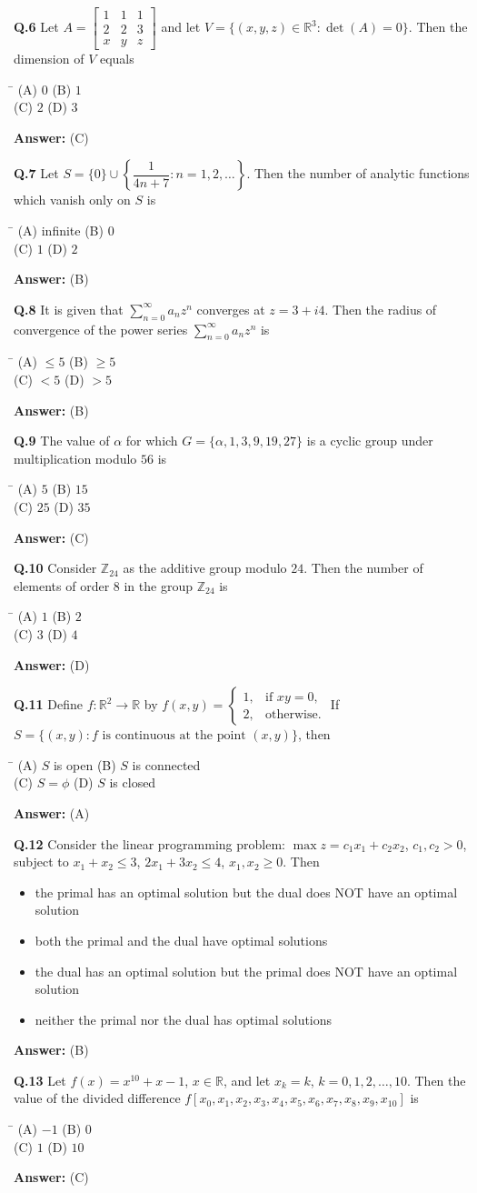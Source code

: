 \documentclass[11pt,a4paper]{article}
\newcommand{\optsfourA}[4]{%
  \begin{tabbing}
    \hspace{0.48\linewidth}\=\kill
    (A) #1 \> (B) #2 \\[2pt]
    (C) #3 \> (D) #4
  \end{tabbing}%
}
\newcommand{\optslistA}[4]{%
  \begin{itemize}
    \setlength{\itemsep}{2pt}\setlength{\parskip}{0pt}
    \item[(A)] #1
    \item[(B)] #2
    \item[(C)] #3
    \item[(D)] #4
  \end{itemize}%
}
\newcommand{\ans}[1]{\textbf{Answer:} #1\par\medskip}
\begin{document}
\textbf{Q.6} Let $A = \begin{bmatrix} 1 & 1 & 1 \\ 2 & 2 & 3 \\ x & y & z \end{bmatrix}$ and let $V = \{(x, y, z) \in \mathbb{R}^3 : \det(A) = 0\}$. Then the dimension of $V$ equals
\optsfourA{$0$}{$1$}{$2$}{$3$}
\ans{(C)}

\textbf{Q.7} Let $S = \{0\} \cup \left\{\dfrac{1}{4n + 7} : n = 1, 2, \dots\right\}$. Then the number of analytic functions which vanish only on $S$ is
\optsfourA{infinite}{$0$}{$1$}{$2$}
\ans{(B)}

\textbf{Q.8} It is given that $\displaystyle\sum_{n=0}^{\infty} a_n z^n$ converges at $z = 3 + i4$. Then the radius of convergence of the power series $\displaystyle\sum_{n=0}^{\infty} a_n z^n$ is
\optsfourA{$\le 5$}{$\ge 5$}{$< 5$}{$> 5$}
\ans{(B)}

\textbf{Q.9} The value of $\alpha$ for which $G = \{\alpha, 1, 3, 9, 19, 27\}$ is a cyclic group under multiplication modulo $56$ is
\optsfourA{$5$}{$15$}{$25$}{$35$}
\ans{(C)}

\textbf{Q.10} Consider $\mathbb{Z}_{24}$ as the additive group modulo $24$. Then the number of elements of order $8$ in the group $\mathbb{Z}_{24}$ is
\optsfourA{$1$}{$2$}{$3$}{$4$}
\ans{(D)}

\textbf{Q.11} Define $f : \mathbb{R}^2 \to \mathbb{R}$ by $f(x, y) = \begin{cases} 1, & \text{if } xy = 0, \\ 2, & \text{otherwise.} \end{cases}$ If $S = \{(x, y) : f \text{ is continuous at the point } (x, y)\}$, then
\optsfourA{$S$ is open}{$S$ is connected}{$S = \phi$}{$S$ is closed}
\ans{(A)}

\textbf{Q.12} Consider the linear programming problem: $\max z = c_1 x_1 + c_2 x_2$, $c_1, c_2 > 0$, subject to $x_1 + x_2 \le 3$, $2x_1 + 3x_2 \le 4$, $x_1, x_2 \ge 0$. Then
\optslistA{the primal has an optimal solution but the dual does NOT have an optimal solution}{both the primal and the dual have optimal solutions}{the dual has an optimal solution but the primal does NOT have an optimal solution}{neither the primal nor the dual has optimal solutions}
\ans{(B)}

\textbf{Q.13} Let $f(x) = x^{10} + x - 1$, $x \in \mathbb{R}$, and let $x_k = k$, $k = 0, 1, 2, \dots, 10$. Then the value of the divided difference $f[x_0, x_1, x_2, x_3, x_4, x_5, x_6, x_7, x_8, x_9, x_{10}]$ is
\optsfourA{$-1$}{$0$}{$1$}{$10$}
\ans{(C)}
\end{document}

